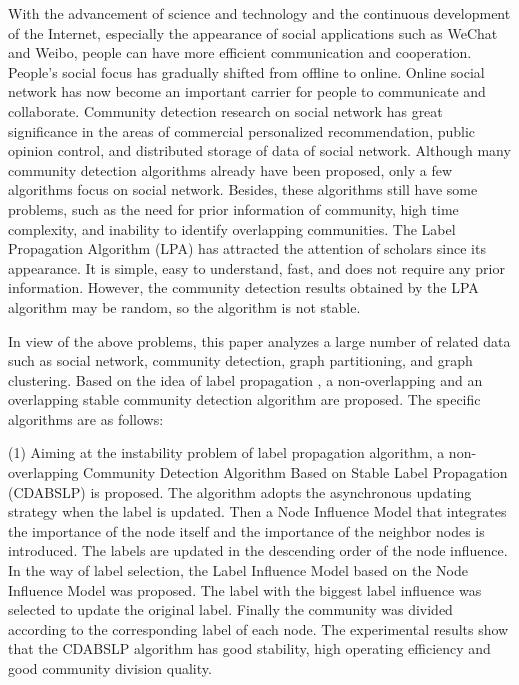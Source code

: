 \begin{englishabstract}

With the advancement of science and technology and the continuous development of the Internet, especially the appearance of social applications such as WeChat and Weibo, people can have more efficient communication and cooperation. People's social focus has gradually shifted from offline to online. Online social network has now become an important carrier for people to communicate and collaborate. Community detection research on social network has great significance in the areas of commercial personalized recommendation, public opinion control, and distributed storage of data of social network. Although many community detection algorithms already have been proposed, only a few algorithms focus on social network. Besides, these algorithms still have some problems, such as the need for prior information of community, high time complexity, and inability to identify overlapping communities. The Label Propagation Algorithm (LPA) has attracted the attention of scholars since its appearance. It is simple, easy to understand, fast, and does not require any prior information. However, the community detection results obtained by the LPA algorithm may be random, so the algorithm is not stable.

In view of the above problems, this paper analyzes a large number of related data such as social network, community detection, graph partitioning, and graph clustering. Based on the idea of label propagation , a non-overlapping and  an overlapping stable community detection algorithm are proposed. The specific algorithms are as follows:

(1) Aiming at the instability problem of label propagation algorithm, a non-overlapping Community Detection Algorithm Based on Stable Label Propagation (CDABSLP) is proposed. The algorithm adopts the asynchronous updating strategy when the label is updated. Then a Node Influence Model that integrates the importance of the node itself and the importance of the neighbor nodes is introduced. The labels are updated in the descending order of the node influence. In the way of label selection, the Label Influence Model based on the Node Influence Model was proposed. The label with the biggest label influence was selected to update the original label. Finally the community was divided according to the corresponding label of each node. The experimental results show that the CDABSLP algorithm has good stability, high operating efficiency and good community division quality.
   

\end{englishabstract}
